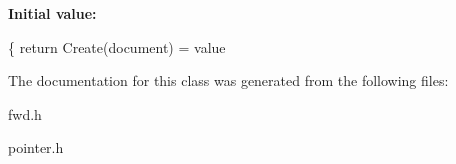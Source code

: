 {\bfseries Initial value\+:}
\begin{DoxyCode}
\{
            \textcolor{keywordflow}{return} Create(document) = value
\end{DoxyCode}


The documentation for this class was generated from the following files\+:\begin{DoxyCompactItemize}
\item 
fwd.\+h\item 
pointer.\+h\end{DoxyCompactItemize}
